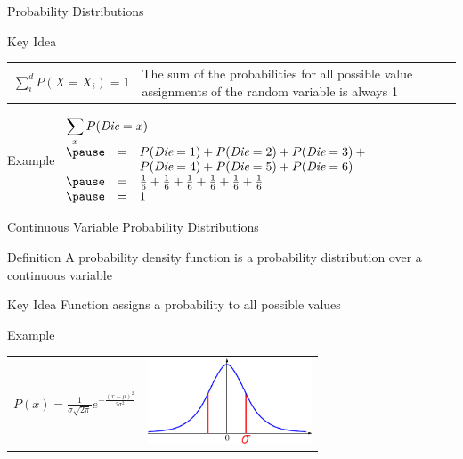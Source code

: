 \documentclass[14pt]{beamer}
\begin{document}
\begin{frame}{Probability Distributions}
	\begin{block}{Key Idea}
		\begin{tabular}{lm{2.4in}@{}}
			\large $\sum\limits^{d}_{i}{P(X=X_{i})} = 1$
			&
			The sum of the probabilities for all possible value assignments of the random variable is always 1
		\end{tabular}
	\end{block}
	\pause
	\begin{block}{Example}
		$
		\begin{array}{lll}
			\lefteqn{\sum\limits_{x}{P(\textit{Die}=x)}} \\
			\pause
			& = & P(\textit{Die}=1) + P(\textit{Die}=2) + P(\textit{Die}=3) + \mbox{}\\
			&   & P(\textit{Die}=4) + P(\textit{Die}=5) + P(\textit{Die}=6) \\
			\pause
			& = & \frac{1}{6} + \frac{1}{6} + \frac{1}{6} + \frac{1}{6} + \frac{1}{6} + \frac{1}{6} \\
			\pause
			& = & 1
		\end{array}
		$
	\end{block}
\end{frame}
\begin{frame}{Continuous Variable Probability Distributions}
	\begin{block}{Definition}
		A \alert{probability density function} is a probability distribution over a continuous variable
	\end{block}
	\begin{block}{Key Idea}
		Function assigns a probability to all possible values
	\end{block}
	\pause
	\begin{block}{Example}
		\begin{tabular}{lr}
			\large $P(x) = \frac{1}{\sigma\sqrt{2\pi}}e^{-\frac{(x - \mu)^{2}}{2\sigma^{2}}}$ 
			&
			\parbox{2in}{\includegraphics[height=1in]{gaussian-density}}
		\end{tabular}
	\end{block}
\end{frame}
\end{document}
